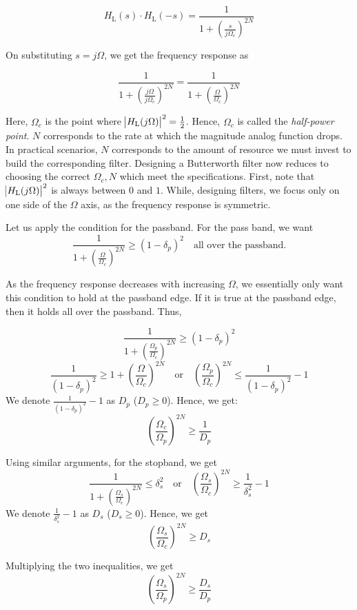 \documentclass{article}
\theoremstyle{definition}
\newcommand\ddfrac[2]{\frac{\displaystyle #1}{\displaystyle #2}}
\begin{document}
\[
    H_{\text{L}}(s) \cdot H_{\text{L}}(-s) = \ddfrac{1}{1 + \left( \frac{s}{j \Omega_c} \right)^{2N}}
\]

On substituting $s = j\Omega$, we get the frequency response as

\[
    \ddfrac{1}{1 + \left( \frac{j \Omega}{j \Omega_c} \right)^{2N}} =  \boxed{\ddfrac{1}{1 + \left( \frac{\Omega}{\Omega_c} \right)^{2N}}}
\]

Here, $\Omega_c$ is the point where $\abs{H_{\text{L}}(j\Omega)}^2 = \frac{1}{2}$. Hence, $\Omega_c$ is called the \textit{half-power point}. $N$ corresponds to the rate at which the magnitude analog function drops. In practical scenarios, $N$ corresponds to the amount of resource we must invest to build the corresponding filter. Designing a Butterworth filter now reduces to choosing the correct $\Omega_c , N$ which meet the specifications. First, note that $\abs{H_{\text{L}}(j\Omega)}^2$ is always between $0$ and $1$. While, designing filters, we focus only on one side of the $\Omega$ axis, as the frequency response is symmetric. \medskip

Let us apply the condition for the passband. For the pass band, we want 
\[
    \ddfrac{1}{1 + \left( \frac{\Omega}{\Omega_c} \right)^{2N}} \geq (1-\delta_p)^2 \quad \text{all over the passband.}
\]

As the frequency response decreases with increasing $\Omega$, we essentially only want this condition to hold at the passband edge. If it is true at the passband edge, then it holds all over the passband. Thus,

\[
    \ddfrac{1}{1 + \left( \frac{\Omega_p}{\Omega_c} \right)^{2N}} \geq (1-\delta_p)^2
\]
\[
    \ddfrac{1}{(1-\delta_p)^2} \geq 1 + \left( \frac{\Omega}{\Omega_c} \right)^{2N} \quad \text{or} \quad \left( \frac{\Omega_p}{\Omega_c} \right)^{2N} \leq \frac{1}{(1-\delta_p)^2} - 1
\]
We denote $\frac{1}{(1-\delta_p)^2} - 1$ as $D_p$ ($D_p \geq 0$). Hence, we get:
\[
    \boxed{\left( \frac{\Omega_c}{\Omega_p} \right)^{2N} \geq \frac{1}{D_p}}
\] \medskip

Using similar arguments, for the stopband, we get
\[
   \ddfrac{1}{1 + \left( \frac{\Omega_s}{\Omega_c} \right)^{2N}} \leq \delta^2_s \quad \text{or} \quad \left( \frac{\Omega_s}{\Omega_c} \right)^{2N} \geq \frac{1}{\delta^2_s} - 1
\]
We denote $\frac{1}{\delta^2_s} - 1$ as $D_s$ ($D_s \geq 0$). Hence, we get 
\[
     \boxed{\left( \frac{\Omega_s}{\Omega_c} \right)^{2N} \geq D_s}
\]  

Multiplying the two inequalities, we get
\[
    \left( \frac{\Omega_s}{\Omega_p} \right)^{2N} \geq \frac{D_s}{D_p}
\]
\end{document}
